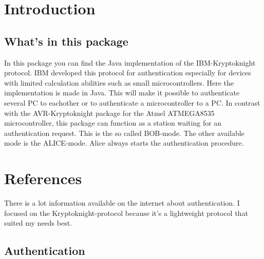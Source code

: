 \hypertarget{main_intro_sec}{}\section{Introduction}\label{main_intro_sec}
\hypertarget{main_what_in}{}\subsection{What's in this package}\label{main_what_in}
In this package you can find the Java implementation of the IBM-Kryptoknight protocol. IBM developed this protocol for authentication especially for devices with limited calculation abilities such as small microcontrollers. Here the implementation is made in Java. This will make it possible to authenticate several PC to eachother or to authenticate a microcontroller to a PC. In contrast with the AVR-Kryptoknight package for the Atmel ATMEGA8535 microcontroller, this package can function as a station waiting for an authentication request. This is the so called BOB-mode. The other available mode is the ALICE-mode. Alice always starts the authentication procedure.\hypertarget{main_References}{}\section{References}\label{main_References}
There is a lot information available on the internet about authentication. I focused on the Kryptoknight-protocol because it's a lightweight protocol that suited my needs best.\hypertarget{main_Authentication}{}\subsection{Authentication}\label{main_Authentication}
